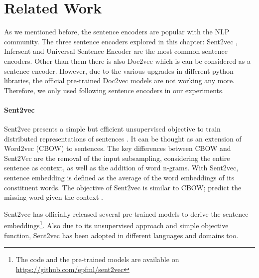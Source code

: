 \section{Related Work}
\label{sec:sentence_related}
As we mentioned before, the sentence encoders are popular with the NLP community. The three sentence encoders explored in this chapter: Sent2vec \cite{pagliardini-etal-2018-unsupervised}, Infersent \cite{conneau-EtAl:2017:EMNLP2017} and Universal Sentence Encoder \cite{cer2018universal} are the most common sentence encoders. Other than them there is also Doc2vec \cite{pmlr-v32-le14} which is can be considered as a sentence encoder. However, due to the various upgrades in different python libraries, the official pre-trained Doc2vec models are not working any more. Therefore, we only used following sentence encoders in our experiments.

\paragraph{Sent2vec}
Sent2vec presents a simple but efficient unsupervised objective to train distributed representations of sentences \cite{pagliardini-etal-2018-unsupervised}. It can be thought as an extension of Word2vec (CBOW) to sentences. The key differences between CBOW and Sent2Vec are the removal of the input subsampling, considering the entire sentence as context, as well as the addition of word n-grams. With Sent2vec, sentence embedding is defined as the average of the word embeddings of its constituent words. The objective of Sent2vec is similar to CBOW; predict the missing word given the context \cite{pagliardini-etal-2018-unsupervised}. 

Sent2vec has officially released several pre-trained models to derive the sentence embeddings\footnote{The code and the pre-trained models are available on \url{https://github.com/epfml/sent2vec}}. Also due to its unsupervised approach and simple objective function, Sent2vec has been adopted in different languages and domains too.  


